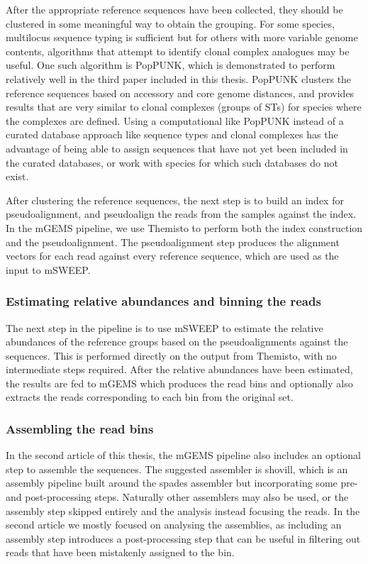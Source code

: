 \documentclass[officiallayout]{tktla}
\begin{document}
After the appropriate reference sequences have been collected, they
should be clustered in some meaningful way to obtain the grouping. For
some species, multilocus sequence typing is sufficient but for others
with more variable genome contents, algorithms that attempt to
identify clonal complex analogues may be useful. One such algorithm is
PopPUNK, which is demonstrated to perform relatively well in the third
paper included in this thesis. PopPUNK clusters the reference
sequences based on accessory and core genome distances, and provides
results that are very similar to clonal complexes (groups of STs) for
species where the complexes are defined. Using a computational like
PopPUNK instead of a curated database approach like sequence types and
clonal complexes has the advantage of being able to assign sequences
that have not yet been included in the curated databases, or work with
species for which such databases do not exist.

After clustering the reference sequences, the next step is to build an
index for pseudoalignment, and pseudoalign the reads from the samples
against the index. In the mGEMS pipeline, we use Themisto to perform
both the index construction and the pseudoalignment. The
pseudoalignment step produces the alignment vectors for each read
against every reference sequence, which are used as the input to
mSWEEP.

\subsubsection{Estimating relative abundances and binning the reads}

The next step in the pipeline is to use mSWEEP to estimate the
relative abundances of the reference groups based on the
pseudoalignments against the sequences. This is performed directly on
the output from Themisto, with no intermediate steps required. After
the relative abundances have been estimated, the results are fed to
mGEMS which produces the read bins and optionally also extracts the
reads corresponding to each bin from the original set.

\subsubsection{Assembling the read bins}

In the second article of this thesis, the mGEMS pipeline also includes
an optional step to assemble the sequences. The suggested assembler is
shovill, which is an assembly pipeline built around the spades
assembler but incorporating some pre- and post-processing
steps. Naturally other assemblers may also be used, or the assembly
step skipped entirely and the analysis instead focusing the reads. In
the second article we mostly focused on analysing the assemblies, as
including an assembly step introduces a post-processing step that can
be useful in filtering out reads that have been mistakenly assigned to
the bin.
\end{document}
